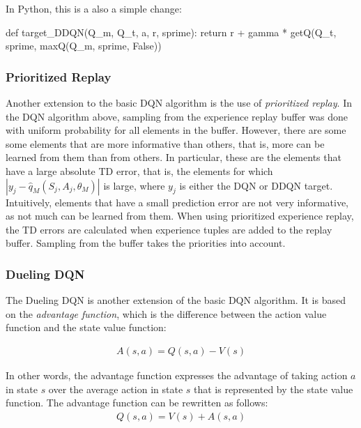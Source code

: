 In Python, this is a also a simple change:

\begin{pythoncode}
def target_DDQN(Q_m, Q_t, a, r, sprime):
    return r + gamma * getQ(Q_t, sprime, maxQ(Q_m, sprime, False))
\end{pythoncode}

\subsubsection*{Prioritized Replay}

Another extension to the basic DQN algorithm is the use of \emph{prioritized replay}. In the DQN algorithm above, sampling from the experience replay buffer was done with uniform probability for all elements in the buffer. However, there are some some elements that are more informative than others, that is, more can be learned from them than from others. In particular, these are the elements that have a large absolute TD error, that is, the elements for which $|y_j - \hat{q}_M (S_j, A_j, \theta_M)|$ is large, where $y_j$ is either the DQN or DDQN target. Intuitively, elements that have a small prediction error are not very informative, as not much can be learned from them. When using prioritized experience replay, the TD errors are calculated when experience tuples are added to the replay buffer. Sampling from the buffer takes the priorities into account. 

\subsubsection*{Dueling DQN}

The Dueling DQN is another extension of the basic DQN algorithm. It is based on the \emph{advantage function}, which is the difference between the action value function and the state value function:


\begin{align*}
A(s, a) = Q(s, a) - V(s)
\end{align*}

In other words, the advantage function expresses the advantage of taking action $a$ in state $s$ over the average action in state $s$ that is represented by the state value function. The advantage function can be rewritten as follows:
\begin{align*}
Q(s, a) = V(s) + A(s, a)
\end{align*}

